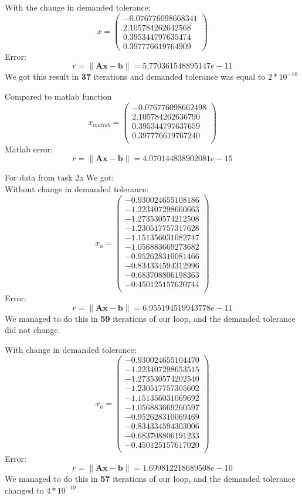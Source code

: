 \documentclass{report}
\begin{document}
With the change in demanded tolerance:
\[ x = \left( \begin{array}{cc}
  -0.076776098668341 \\
   2.105784262642568 \\
   0.395344797635474 \\
   0.397776619764909
\end{array} \right)
\]
Error:
\[ r = \| \mathbf{A}\mathbf{x} - \mathbf{b}\| = 5.770361548895147e-11 \]
We got this result in \textbf{37} iterations and demanded tolerance was equal to $2*10^{-10}$

Compared to matlab function
\[ x_{matlab} = \left( \begin{array}{cc}
  -0.076776098662498 \\
   2.105784262636790 \\
   0.395344797637659 \\
   0.397776619767240 \\
\end{array} \right)
\]
Matlab error:
\[ r = \| \mathbf{A}\mathbf{x} - \mathbf{b}\| = 4.070144838902081e-15 \]

For data from task 2a We got: \\
Without change in demanded tolerance:
\[ x_a = \left( \begin{array}{cc}
-0.930024655108186 \\
-1.223407298660663 \\
-1.273530574212508 \\
-1.230517757317628 \\
-1.151356031082747 \\
-1.056883669273682 \\
-0.952628310081466 \\
-0.834334594312996 \\
-0.683708806198363 \\
-0.450125157620744 \\
\end{array} \right)
\]
Error:
\[ r = \| \mathbf{A}\mathbf{x} - \mathbf{b}\| = 6.955194519943778e-11 \]
We managed to do this in \textbf{59} iterations of our loop, and the demanded tolerance did not change.

With change in demanded tolerance:
\[ x_a = \left( \begin{array}{cc}
-0.930024655104470 \\
-1.223407298653515 \\
-1.273530574202540 \\
-1.230517757305602 \\
-1.151356031069692 \\
-1.056883669260597 \\
-0.952628310069469 \\
-0.834334594303006 \\
-0.683708806191233 \\
-0.450125157617020 \\
\end{array} \right)
\]
Error:
\[ r = \| \mathbf{A}\mathbf{x} - \mathbf{b}\| = 1.699812218689508e-10 \]
We managed to do this in \textbf{57} iterations of our loop, and the demanded tolerance changed to $4*10^{-10}$
\end{document}
